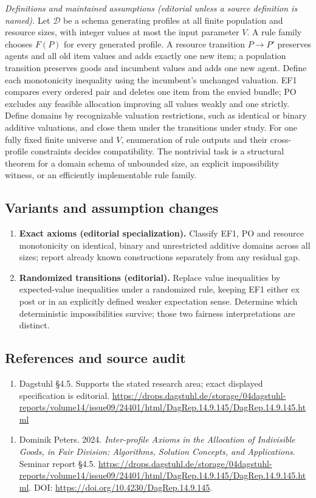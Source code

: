 \documentclass[11pt,a4paper]{article}
\begin{document}
\emph{Definitions and maintained assumptions (editorial unless a source definition is named).} Let \(\mathcal D\) be a schema generating profiles at all finite population and resource sizes, with integer values at most the input parameter \(V\). A rule family chooses \(F(P)\) for every generated profile. A resource transition \(P\to P'\) preserves agents and all old item values and adds exactly one new item; a population transition preserves goods and incumbent values and adds one new agent. Define each monotonicity inequality using the incumbent's unchanged valuation. EF1 compares every ordered pair and deletes one item from the envied bundle; PO excludes any feasible allocation improving all values weakly and one strictly. Define domains by recognizable valuation restrictions, such as identical or binary additive valuations, and close them under the transitions under study. For one fully fixed finite universe and \(V\), enumeration of rule outputs and their cross-profile constraints decides compatibility. The nontrivial task is a structural theorem for a domain schema of unbounded size, an explicit impossibility witness, or an efficiently implementable rule family.
\subsection*{Variants and assumption changes}
\begin{enumerate}
\item \textbf{Exact axioms (editorial specialization).} Classify EF1, PO and resource monotonicity on identical, binary and unrestricted additive domains across all sizes; report already known constructions separately from any residual gap.
\item \textbf{Randomized transitions (editorial).} Replace value inequalities by expected-value inequalities under a randomized rule, keeping EF1 either ex post or in an explicitly defined weaker expectation sense. Determine which deterministic impossibilities survive; those two fairness interpretations are distinct.
\end{enumerate}
\subsection*{References and source audit}
\begin{enumerate}
\item Dagstuhl §4.5. Supports the stated research area; exact displayed specification is editorial. \url{https://drops.dagstuhl.de/storage/04dagstuhl-reports/volume14/issue09/24401/html/DagRep.14.9.145/DagRep.14.9.145.html}
\end{enumerate}
\begin{enumerate}\raggedright
\item\hypertarget{definitions:source:30007560:1}{} Dominik Peters. 2024. \emph{Inter-profile Axioms in the Allocation of Indivisible Goods, in Fair Division: Algorithms, Solution Concepts, and Applications}. Seminar report §4.5.
\url{https://drops.dagstuhl.de/storage/04dagstuhl-reports/volume14/issue09/24401/html/DagRep.14.9.145/DagRep.14.9.145.html}.
DOI: \url{https://doi.org/10.4230/DagRep.14.9.145}.
\end{enumerate}
\end{document}
